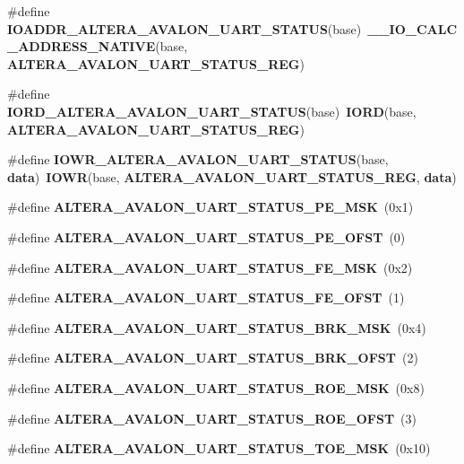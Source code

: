 \begin{DoxyCompactItemize}
\item 
\#define {\bf I\+O\+A\+D\+D\+R\+\_\+\+A\+L\+T\+E\+R\+A\+\_\+\+A\+V\+A\+L\+O\+N\+\_\+\+U\+A\+R\+T\+\_\+\+S\+T\+A\+T\+US}(base)~{\bf \+\_\+\+\_\+\+I\+O\+\_\+\+C\+A\+L\+C\+\_\+\+A\+D\+D\+R\+E\+S\+S\+\_\+\+N\+A\+T\+I\+VE}(base, {\bf A\+L\+T\+E\+R\+A\+\_\+\+A\+V\+A\+L\+O\+N\+\_\+\+U\+A\+R\+T\+\_\+\+S\+T\+A\+T\+U\+S\+\_\+\+R\+EG})
\item 
\#define {\bf I\+O\+R\+D\+\_\+\+A\+L\+T\+E\+R\+A\+\_\+\+A\+V\+A\+L\+O\+N\+\_\+\+U\+A\+R\+T\+\_\+\+S\+T\+A\+T\+US}(base)~{\bf I\+O\+RD}(base, {\bf A\+L\+T\+E\+R\+A\+\_\+\+A\+V\+A\+L\+O\+N\+\_\+\+U\+A\+R\+T\+\_\+\+S\+T\+A\+T\+U\+S\+\_\+\+R\+EG})
\item 
\#define {\bf I\+O\+W\+R\+\_\+\+A\+L\+T\+E\+R\+A\+\_\+\+A\+V\+A\+L\+O\+N\+\_\+\+U\+A\+R\+T\+\_\+\+S\+T\+A\+T\+US}(base,  {\bf data})~{\bf I\+O\+WR}(base, {\bf A\+L\+T\+E\+R\+A\+\_\+\+A\+V\+A\+L\+O\+N\+\_\+\+U\+A\+R\+T\+\_\+\+S\+T\+A\+T\+U\+S\+\_\+\+R\+EG}, {\bf data})
\item 
\#define {\bf A\+L\+T\+E\+R\+A\+\_\+\+A\+V\+A\+L\+O\+N\+\_\+\+U\+A\+R\+T\+\_\+\+S\+T\+A\+T\+U\+S\+\_\+\+P\+E\+\_\+\+M\+SK}~(0x1)
\item 
\#define {\bf A\+L\+T\+E\+R\+A\+\_\+\+A\+V\+A\+L\+O\+N\+\_\+\+U\+A\+R\+T\+\_\+\+S\+T\+A\+T\+U\+S\+\_\+\+P\+E\+\_\+\+O\+F\+ST}~(0)
\item 
\#define {\bf A\+L\+T\+E\+R\+A\+\_\+\+A\+V\+A\+L\+O\+N\+\_\+\+U\+A\+R\+T\+\_\+\+S\+T\+A\+T\+U\+S\+\_\+\+F\+E\+\_\+\+M\+SK}~(0x2)
\item 
\#define {\bf A\+L\+T\+E\+R\+A\+\_\+\+A\+V\+A\+L\+O\+N\+\_\+\+U\+A\+R\+T\+\_\+\+S\+T\+A\+T\+U\+S\+\_\+\+F\+E\+\_\+\+O\+F\+ST}~(1)
\item 
\#define {\bf A\+L\+T\+E\+R\+A\+\_\+\+A\+V\+A\+L\+O\+N\+\_\+\+U\+A\+R\+T\+\_\+\+S\+T\+A\+T\+U\+S\+\_\+\+B\+R\+K\+\_\+\+M\+SK}~(0x4)
\item 
\#define {\bf A\+L\+T\+E\+R\+A\+\_\+\+A\+V\+A\+L\+O\+N\+\_\+\+U\+A\+R\+T\+\_\+\+S\+T\+A\+T\+U\+S\+\_\+\+B\+R\+K\+\_\+\+O\+F\+ST}~(2)
\item 
\#define {\bf A\+L\+T\+E\+R\+A\+\_\+\+A\+V\+A\+L\+O\+N\+\_\+\+U\+A\+R\+T\+\_\+\+S\+T\+A\+T\+U\+S\+\_\+\+R\+O\+E\+\_\+\+M\+SK}~(0x8)
\item 
\#define {\bf A\+L\+T\+E\+R\+A\+\_\+\+A\+V\+A\+L\+O\+N\+\_\+\+U\+A\+R\+T\+\_\+\+S\+T\+A\+T\+U\+S\+\_\+\+R\+O\+E\+\_\+\+O\+F\+ST}~(3)
\item 
\#define {\bf A\+L\+T\+E\+R\+A\+\_\+\+A\+V\+A\+L\+O\+N\+\_\+\+U\+A\+R\+T\+\_\+\+S\+T\+A\+T\+U\+S\+\_\+\+T\+O\+E\+\_\+\+M\+SK}~(0x10)
\item 

\end{DoxyCompactItemize}
